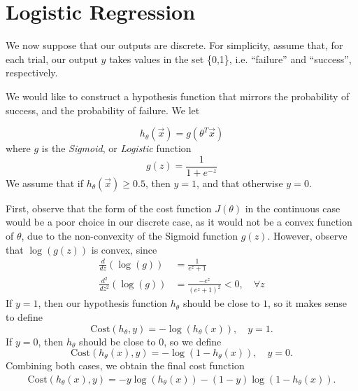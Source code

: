\chapter{Logistic Regression}
We now suppose that our outputs are discrete. For simplicity, assume that, for
each trial, our output $y$ takes values in the set \{0,1\}, i.e. ``failure''
and ``success'', respectively.

We would like to construct a hypothesis function that mirrors the probability of
success, and the probability of failure. We let

\begin{equation*} 
	h_{\theta}(\vec{x}) = g(\theta^{T}\vec{x})
\end{equation*}
where $g$ is the \emph{Sigmoid}, or \emph{Logistic} function
\begin{equation*} 
	g(z) = \frac{1}{1+e^{-z}}
\end{equation*}
We assume that if $h_{\theta}(\vec{x}) \ge 0.5$, then $y=1$, and that otherwise 
$y = 0$.

First, observe that the form of the cost function $J(\theta)$ in the continuous
case would be a poor choice in our discrete case,
as it would not be a convex function of $\theta$, due to the non-convexity of
the Sigmoid function $g(z)$. However, observe that $\log(g(z))$ is convex, since
\begin{equation*} 
	\begin{split}
		\frac{d}{dz}(\log(g)) & = \frac{1}{e^{z}+1}\\
		\frac{d^{2}}{dz^{2}}(\log(g)) & = \frac{-e^{z}}{(e^{z}+1)^{2}} < 0, \quad
		\forall z
	\end{split} 
\end{equation*}
If $y=1$, then our hypothesis function $h_{\theta}$ should be close to $1$, so
it makes sense to define
\begin{equation*} 
	\text{Cost}(h_{\theta}, y) = -\log(h_{\theta}(x)), \quad y=1.
\end{equation*}
If $y=0$, then $h_{\theta}$ should be close to $0$, so we define
\begin{equation*} 
	\text{Cost}(h_{\theta}(x), y)= -\log(1 - h_{\theta}(x)), \quad y=0.
\end{equation*}
Combining both cases, we obtain the final cost function
\begin{equation*}
	\begin{split}
		\text{Cost}(h_{\theta}(x), y) = -y\log(h_{\theta}(x)) -
		(1-y)\log(1-h_{\theta}(x)).
	\end{split}
\end{equation*}
